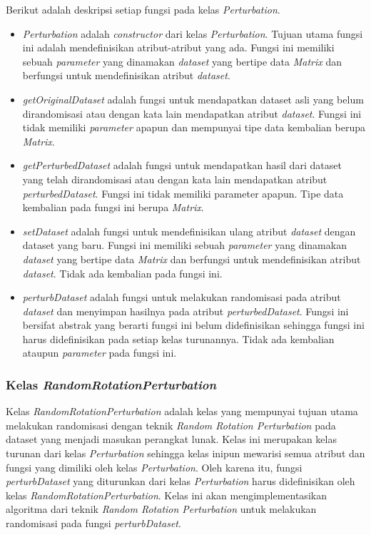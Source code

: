 Berikut adalah deskripsi setiap fungsi pada kelas \textit{Perturbation}.
\begin{itemize}
	\item \textit{Perturbation} adalah \textit{constructor} dari kelas \textit{Perturbation}. Tujuan utama fungsi ini adalah mendefinisikan atribut-atribut yang ada. Fungsi ini memiliki sebuah \textit{parameter} yang dinamakan \textit{dataset} yang bertipe data \textit{Matrix} dan berfungsi untuk mendefinisikan atribut \textit{dataset}.
	\item \textit{getOriginalDataset} adalah fungsi untuk mendapatkan dataset asli yang belum dirandomisasi atau dengan kata lain mendapatkan atribut \textit{dataset}. Fungsi ini tidak memiliki \textit{parameter} apapun dan mempunyai tipe data kembalian berupa \textit{Matrix}.
	\item \textit{getPerturbedDataset} adalah fungsi untuk mendapatkan hasil dari dataset yang telah dirandomisasi atau dengan kata lain mendapatkan atribut \textit{perturbedDataset}. Fungsi ini tidak memiliki parameter apapun. Tipe data kembalian pada fungsi ini berupa \textit{Matrix}.
	\item \textit{setDataset} adalah fungsi untuk mendefinisikan ulang atribut \textit{dataset} dengan dataset yang baru. Fungsi ini memiliki sebuah \textit{parameter} yang dinamakan \textit{dataset} yang bertipe data \textit{Matrix} dan berfungsi untuk mendefinisikan atribut \textit{dataset}. Tidak ada kembalian pada fungsi ini.
	\item \textit{perturbDataset} adalah fungsi untuk melakukan randomisasi pada atribut \textit{dataset} dan menyimpan hasilnya pada atribut \textit{perturbedDataset}. Fungsi ini bersifat abstrak yang berarti fungsi ini belum didefinisikan sehingga fungsi ini harus didefinisikan pada setiap kelas turunannya. Tidak ada kembalian ataupun \textit{parameter} pada fungsi ini.
\end{itemize}

\subsubsection{Kelas \textit{RandomRotationPerturbation}}
\label{subsubsec:kelas-rrp}

Kelas \textit{RandomRotationPerturbation} adalah kelas yang mempunyai tujuan utama melakukan randomisasi dengan teknik \textit{Random Rotation Perturbation} pada dataset yang menjadi masukan perangkat lunak. Kelas ini merupakan kelas turunan dari kelas \textit{Perturbation} sehingga kelas inipun mewarisi semua atribut dan fungsi yang dimiliki oleh kelas \textit{Perturbation}. Oleh karena itu, fungsi \textit{perturbDataset} yang diturunkan dari kelas \textit{Perturbation} harus didefinisikan oleh kelas \textit{RandomRotationPerturbation}. Kelas ini akan mengimplementasikan algoritma dari teknik \textit{Random Rotation Perturbation} untuk melakukan randomisasi pada fungsi \textit{perturbDataset}.

